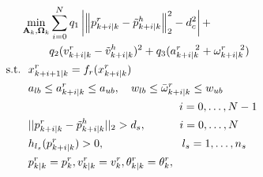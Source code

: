 \documentclass[journal]{IEEEtran}
\begin{document}
\begin{subequations}\label{eqn:path_plan_mpc}
\begin{align}
&\min_{\mathbf{A}_k,\mathbf{\Omega}_k}\sum\limits_{i=0}^{N} q_1\left| \left\|p^r_{k+i|k}-\tilde{p}^h_{k+i|k}\right\|^2_2-d^2_{c}\right| + \notag\\
 			&\hspace{9mm} q_2(v^r_{k+i|k}-\tilde{v}^h_{k+i|k})^2+
q_3(a^{r~~~~2}_{k+i|k}+\omega^{r~~~~2}_{k+i|k})\label{eqn:obj}\\
\text{s.t.}&~~x^r_{k+i+1|k}=f_r(x^r_{k+i|k})\label{eqn:robot_dyn}\\
&~~a_{lb}\le a^r_{k+i|k}\le a_{ub},~~~ w_{lb}\le \bar{\omega}^r_{k+i|k}\le w_{ub}\label{eqn:constr:w}\\
& \hspace{48mm}~~i=0,\dots,N-1\notag\\
			&~~||p^r_{k+i|k}-\tilde{p}^h_{k+i|k}||_2> d_s, ~~~~\hspace{6mm}i=0,\dots,N\label{eqn:constr:safety_human}\\
			&~~h_{l_s}(p^r_{k+i|k})> 0, ~~~~\hspace{20mm}l_s=1,\dots,n_s\label{eqn:constr:safety_s_obs1}\\
			&~~p^r_{k|k}=p^r_k,v^r_{k|k}=v^r_k,\theta^r_{k|k}=\theta^r_k\label{eqn:constr:init},
		\end{align}
	\end{subequations}        
\end{document}
